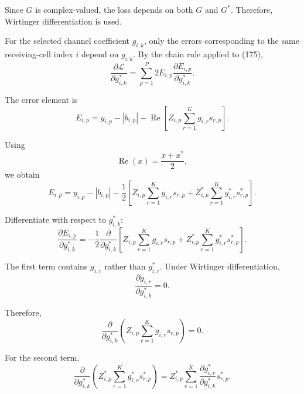 \documentclass[12pt,a4paper]{article}
\begin{document}
Since $G$ is complex-valued, the loss depends on both $G$ and $G^*$.
Therefore, Wirtinger differentiation is used.

For the selected channel coefficient $g_{i,k}$, only the errors
corresponding to the same receiving-cell index $i$ depend on
$g_{i,k}$. By the chain rule applied to (175),
\begin{equation}
\frac{\partial\mathcal L}{\partial g_{i,k}^*}
=
\sum_{p=1}^{P}
2E_{i,p}
\frac{\partial E_{i,p}}{\partial g_{i,k}^*}.
\tag{176}
\end{equation}

The error element is
\begin{equation}
E_{i,p}
=
y_{i,p}
-
|b_{i,p}|
-
\operatorname{Re}
\left[
Z_{i,p}
\sum_{r=1}^{K}
g_{i,r}s_{r,p}
\right].
\tag{177}
\end{equation}

Using
\begin{equation}
\operatorname{Re}(x)
=
\frac{x+x^*}{2},
\tag{178}
\end{equation}
we obtain
\begin{equation}
E_{i,p}
=
y_{i,p}
-
|b_{i,p}|
-
\frac{1}{2}
\left[
Z_{i,p}
\sum_{r=1}^{K}
g_{i,r}s_{r,p}
+
Z_{i,p}^*
\sum_{r=1}^{K}
g_{i,r}^*s_{r,p}^*
\right].
\tag{179}
\end{equation}

Differentiate with respect to $g_{i,k}^*$:
\begin{equation}
\frac{\partial E_{i,p}}{\partial g_{i,k}^*}
=
-\frac{1}{2}
\frac{\partial}{\partial g_{i,k}^*}
\left[
Z_{i,p}
\sum_{r=1}^{K}
g_{i,r}s_{r,p}
+
Z_{i,p}^*
\sum_{r=1}^{K}
g_{i,r}^*s_{r,p}^*
\right].
\tag{180}
\end{equation}

The first term contains $g_{i,r}$ rather than $g_{i,r}^*$. Under
Wirtinger differentiation,
\begin{equation}
\frac{\partial g_{i,r}}{\partial g_{i,k}^*}
=
0.
\tag{181}
\end{equation}

Therefore,
\begin{equation}
\frac{\partial}{\partial g_{i,k}^*}
\left(
Z_{i,p}
\sum_{r=1}^{K}
g_{i,r}s_{r,p}
\right)
=
0.
\tag{182}
\end{equation}

For the second term,
\begin{equation}
\frac{\partial}{\partial g_{i,k}^*}
\left(
Z_{i,p}^*
\sum_{r=1}^{K}
g_{i,r}^*s_{r,p}^*
\right)
=
Z_{i,p}^*
\sum_{r=1}^{K}
\frac{\partial g_{i,r}^*}{\partial g_{i,k}^*}
s_{r,p}^*.
\tag{183}
\end{equation}
\end{document}
